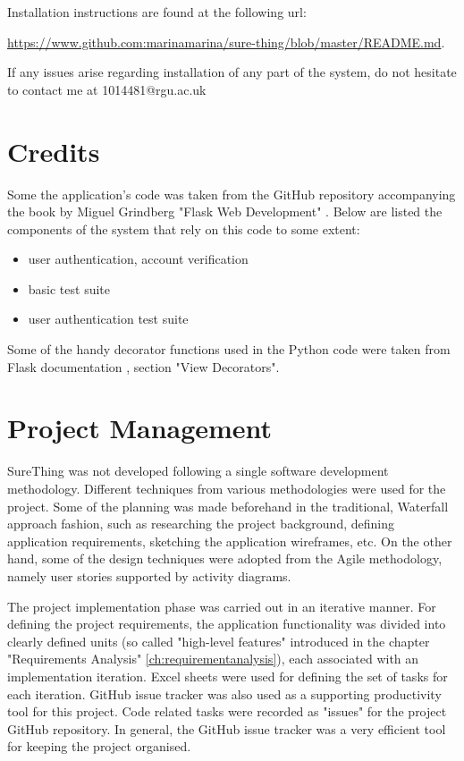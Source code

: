 Installation instructions are found at the following url:

\url{https://www.github.com:marinamarina/sure-thing/blob/master/README.md}.


If any issues arise regarding installation of any part of the system, do not hesitate to contact me at 1014481@rgu.ac.uk

\chapter{Credits}
\label{ch:credits_appendix}
Some the application's code was taken from the GitHub repository accompanying the book by Miguel Grindberg "Flask Web Development" \citep{book:Grindberg2014FlaskWebDevelopment}. Below are listed the components of the system that rely on this code to some extent:

\begin{itemize}
	\item user authentication, account verification
	\item basic test suite
	\item user authentication test suite
\end{itemize}

Some of the handy decorator functions used in the Python code were taken from Flask documentation \citep{documentation:Flask}, section "View Decorators".

\chapter{Project Management}
\label{ch:pm_appendix}
SureThing was not developed following a single software development methodology. Different techniques from various methodologies were used for the project. Some of the planning was made beforehand in the traditional, Waterfall approach fashion, such as researching the project background, defining application requirements, sketching the application wireframes, etc. On the other hand, some of the design techniques were adopted from the Agile methodology, namely user stories supported by activity diagrams. 

The project implementation phase was carried out in an iterative manner. For defining the project requirements, the application functionality was divided into clearly defined units (so called "high-level features" introduced in the chapter "Requirements Analysis" \ref{ch:requirementanalysis}), each associated with an implementation iteration. Excel sheets were used for defining the set of tasks for each iteration. GitHub issue tracker was also used as a supporting productivity tool for this project. Code related tasks were recorded as "issues" for the project GitHub repository. In general, the GitHub issue tracker was a very efficient tool for keeping the project organised. 

